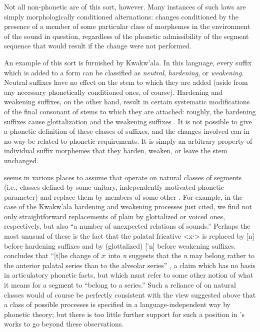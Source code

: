 Not all non-phonetic  are of this sort, however. Many
instances of such laws are simply morphologically conditioned
alternations: changes conditioned by the presence of a member of some
particular class of morphemes in the environment of the sound in
question, regardless of the phonetic admissibility of the segment
sequence that would result if the change were not performed. 

An example of this sort is furnished by Kwakw'ala. In this language,
every suffix which is added to a form can be classified as
\emph{neutral}, \emph{hardening}, or \emph{weakening}. Neutral
suffixes have no effect on the stem to which they are added (aside
from any necessary phonetically conditioned ones, of
course). Hardening and weakening suffixes, on the other hand, result
in certain systematic modifications of the final consonant of stems to
which they are attached: roughly, the hardening suffixes cause
glottalization and the weakening suffixes . It is not possible
to give a phonetic definition of these classes of suffixes, and the
changes involved can in no way be related to phonetic requirements. It
is simply an arbitrary property of individual suffix morphemes that
they harden, weaken, or leave the stem unchanged.

{\Boas} seems in various places to assume that  operate on
natural classes of segments (i.e., classes defined by some unitary,
independently motivated phonetic parameter) and replace them by
members of some other . For example, in the case of the
Kwakw'ala hardening and weakening processes just cited, we find not
only straightforward replacements of plain  by glottalized or
voiced ones, respectively, but also ``a number of unexpected relations
of sounds.'' Perhaps the most unusual of these is the fact that the
palatal fricative <x∙> is replaced by [n] before hardening suffixes
and by (glottalized) ['n] before weakening suffixes. {\Boas} concludes
that ``[t]he change of \emph{x∙} into \emph{n} suggests that the
\emph{n} may belong rather to the anterior palatal series than to the
alveolar series'' \citep[430]{boas11:hail_grammar}, a claim which has
no basis in articulatory phonetic facts, but which must refer to some
other notion of what it means for a segment to ``belong to a series.''
Such a reliance of  on natural classes would of course be
perfectly consistent with the view suggested above that a class of
possible processes is specified in a language-independent way by
phonetic theory; but there is too little further support for such a
position in {\Boas}'s works to go beyond these observations.

